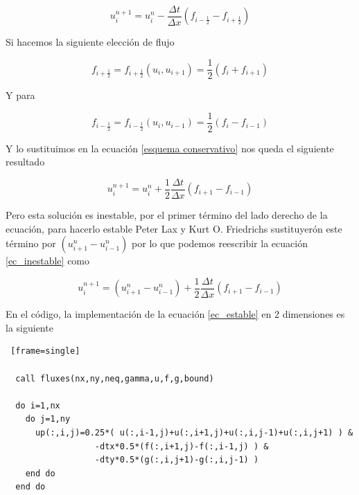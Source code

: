 \documentclass[12pt,a4paper]{book}
\begin{document}
\begin{equation}\label{esquema conservativo}
u_i^{n+1} = u_i^{n} -\frac{\Delta t}{\Delta x} \left(f_{i-\frac{1}{2}} - f_{i+\frac{1}{2}}\right)
\end{equation}



Si hacemos la siguiente elección de flujo 

\begin{equation}
f_{i+\frac{1}{2}} = f_{i+\frac{1}{2}} \left(
u_{i} , u_{i+1}\right) =\frac{1}{2} \left(f_{i} + f_{i+1} \right) 
\end{equation}

Y para 

\begin{equation}
f_{i-\frac{1}{2}} = f_{i-\frac{1}{2}} \left(
u_{i} , u_{i-1}\right) =\frac{1}{2} \left(f_{i} - f_{i-1} \right) 
\end{equation}

Y lo sustituimos en la ecuación \ref{esquema conservativo} nos queda el siguiente resultado

\begin{equation}\label{ec_inestable}
u_i^{n+1} = u_i^{n} + \frac{1}{2}\frac{\Delta t}{\Delta x} \left(f_{i+1} - f_{i-1} \right)
\end{equation}

Pero esta solución es inestable, por el primer término del lado derecho de la ecuación, para hacerlo estable  Peter Lax y Kurt O. Friedrichs sustituyerón este término por $(u_{i+1}^n-u_{i-1}^n)$  por lo que podemos reescribir la ecuación \ref{ec_inestable} como

\begin{equation}\label{ec_estable}
u_i^{n+1} =(u_{i+1}^n-u_{i-1}^n) + \frac{1}{2}\frac{\Delta t}{\Delta x} \left(f_{i+1} - f_{i-1} \right)
\end{equation}

En el código, la implementación de la ecuación \ref{ec_estable} en 2 dimensiones es la siguiente

\begin{lstlisting} [frame=single]

  call fluxes(nx,ny,neq,gamma,u,f,g,bound)

  do i=1,nx
    do j=1,ny
      up(:,i,j)=0.25*( u(:,i-1,j)+u(:,i+1,j)+u(:,i,j-1)+u(:,i,j+1) ) &
                  -dtx*0.5*(f(:,i+1,j)-f(:,i-1,j) ) &
                  -dty*0.5*(g(:,i,j+1)-g(:,i,j-1) )
    end do
  end do
  
\end{lstlisting}
\end{document}
